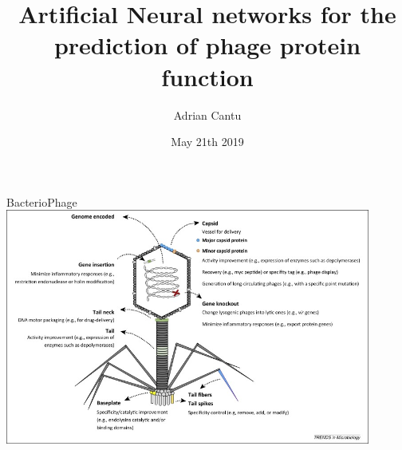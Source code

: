 \documentclass{beamer}
\title[State of the lab - 2019]{Artificial Neural networks for the prediction of phage protein function }
\author[A. Cantu]{Adrian Cantu}
\institute[]{
  San Diego State University \\
  Computational Science Research Center}
\date[05/21/2019]{
  May 21th 2019}
\begin{document}
\begin{frame}
  \titlepage
  \centering
\end{frame}


\begin{frame}{BacterioPhage}
\includegraphics[width=0.90\textwidth]{img01}
\end{frame}
\end{document}
